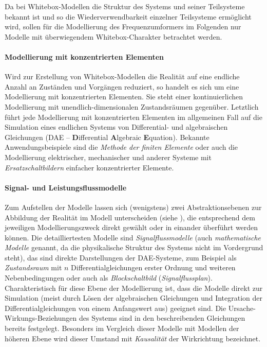 Da bei Whitebox-Modellen die Struktur des Systems und seiner Teilsysteme bekannt ist und so die Wiederverwendbarkeit einzelner Teilsysteme ermöglicht wird, sollen für die Modellierung des Frequenzumformers im Folgenden nur Modelle mit überwiegendem Whitebox-Charakter betrachtet werden.

\paragraph{Modellierung mit konzentrierten Elementen} Wird zur Erstellung von Whitebox-Modellen die Realität auf eine endliche Anzahl an Zuständen und Vorgängen reduziert, so handelt es sich um eine Modellierung mit konzentrierten Elementen. Sie steht einer kontinuierlichen Modellierung mit unendlich-dimensionalen Zustandsräumen gegenüber. Letztlich führt jede Modellierung mit konzentrierten Elementen im allgemeinen Fall auf die Simulation eines endlichen Systems von Differential- und algebraischen Gleichungen (DAE -- \textbf{D}ifferential \textbf{A}lgebraic \textbf{E}quation). Bekannte Anwendungsbeispiele sind die \emph{Methode der finiten Elemente} oder auch die Modellierung elektrischer, mechanischer und anderer Systeme mit \emph{Ersatzschaltbildern} einfacher konzentrierter Elemente. 

\paragraph{Signal- und Leistungsflussmodelle} Zum Aufstellen der Modelle lassen sich (wenigstens) zwei Abstraktionsebenen zur Abbildung der Realität im Modell unterscheiden (siehe \cite{janschekSystementwurfMechatronischerSysteme2010}), die entsprechend dem jeweiligen Modellierungszweck direkt gewählt oder in einander überführt werden können. Die detailliertesten Modelle sind \emph{Signalflussmodelle} (auch \emph{mathematische Modelle} genannt, da die physikalische Struktur des Systems nicht im Vordergrund steht), das sind direkte Darstellungen der DAE-Systeme, zum Beispiel als \emph{Zustandsraum} mit $n$ Differentialgleichungen erster Ordnung und weiteren Nebenbedingungen oder auch als \emph{Blockschaltbild} (\emph{Signalflussplan}). Charakteristisch für diese Ebene der Modellierung ist, dass die Modelle direkt zur Simulation (meist durch Lösen der algebraischen Gleichungen und Integration der Differentialgleichungen von einem Anfangswert aus) geeignet sind. Die Ursache-Wirkungs-Beziehungen des Systems sind in den beschreibenden Gleichungen bereits festgelegt. Besonders im Vergleich dieser Modelle mit Modellen der höheren Ebene wird dieser Umstand mit \emph{Kausalität} der Wirkrichtung bezeichnet.

